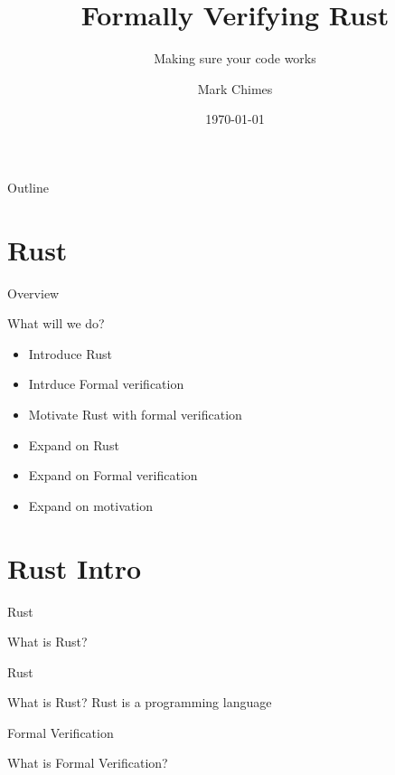 \documentclass{beamer}
\title{Formally Verifying Rust}
\subtitle{Making sure your code works}
\author{Mark Chimes}
\date{\today}
\begin{document}
\begin{frame}
    \titlepage
\end{frame}

\begin{frame}{Outline}
\tableofcontents
\end{frame}

\section{Rust}
\begin{frame}{Overview}
\begin{block}{What will we do?}
\begin{itemize} 
	\item Introduce Rust
	\item Intrduce Formal verification
	\item Motivate Rust with formal verification
	\item Expand on Rust
	\item Expand on Formal verification
	\item Expand on motivation
\end{itemize}
\end{block}
\end{frame}


\section{Rust Intro}
\begin{frame}{Rust}
\begin{block}{What is Rust?}
\end{block}
\end{frame}

\begin{frame}{Rust}
\begin{block}{What is Rust?}
Rust is a programming language
\end{block}
\end{frame}

\begin{frame}{Formal Verification}
\begin{block}{What is Formal Verification?}
\end{block}
\end{frame}
\end{document}
